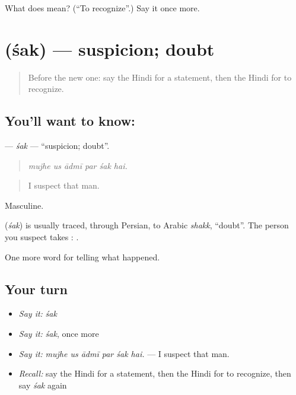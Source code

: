 \begin{tcolorbox}[breakable,colback=teal!4,colframe=teal!35!black,title={Before you move on}]
What does  mean? (\textquotedblleft{}To recognize\textquotedblright{}.) Say it once more.
\end{tcolorbox}
\section[\texorpdfstring{\hi{शक} (śak)}{शक (śak)}]{ (śak) — suspicion; doubt}

\label{lesson:HI-C291-sak}



\begin{quote}
Before the new one: say the Hindi for a statement, then the Hindi for to recognize.
\end{quote}

\subsection*{You'll want to know: }
\textbf{} — \emph{śak} — \textquotedblleft{}suspicion; doubt\textquotedblright{}.

\begin{quote}
     
\end{quote}

\begin{quote}
\emph{mujhe us ādmī par śak hai.}
\end{quote}

\begin{quote}
I suspect that man.
\end{quote}

Masculine.

\begin{cousinweb}
\textbf{} (\emph{śak}) is usually traced, through Persian, to Arabic \emph{shakk}, \textquotedblleft{}doubt\textquotedblright{}. The person you suspect takes \textbf{}: \textbf{    }.
\end{cousinweb}

\begin{grammarlens}[title={What you've built}]
One more word for telling what happened.
\end{grammarlens}

\subsection*{Your turn}
\begin{itemize}
\raggedright
  \item \emph{Say it:} \emph{śak}
  \item \emph{Say it:} \emph{śak}, once more
  \item \emph{Say it:} \emph{mujhe us ādmī par śak hai.} — I suspect that man.
  \item \emph{Recall:} say the Hindi for a statement, then the Hindi for to recognize, then say \emph{śak} again
\end{itemize}

